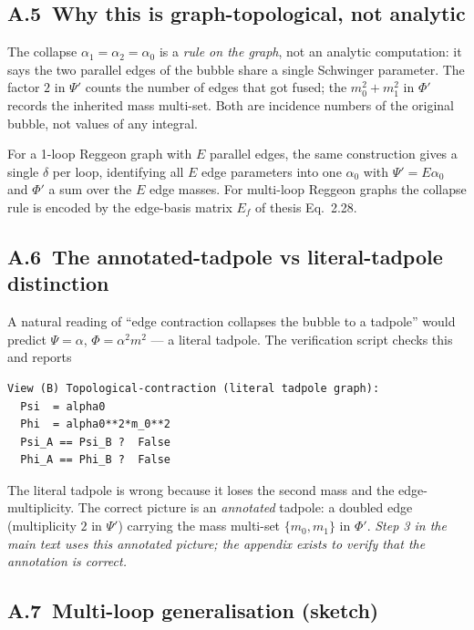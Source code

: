 \documentclass[11pt,a4paper]{article}
\begin{document}
\subsection*{A.5\ Why this is graph-topological, not analytic}

The collapse $\alpha_{1} = \alpha_{2} = \alpha_{0}$ is a \emph{rule on the graph}, not an
analytic computation: it says the two parallel edges of the bubble share a single
Schwinger parameter. The factor $2$ in $\Psi'$ counts the number of edges that got fused;
the $m_{0}^{2}+m_{1}^{2}$ in $\Phi'$ records the inherited mass multi-set. Both are
incidence numbers of the original bubble, not values of any integral.

For a 1-loop Reggeon graph with $E$ parallel edges, the same construction gives a single
$\delta$ per loop, identifying all $E$ edge parameters into one $\alpha_{0}$ with
$\Psi' = E\alpha_{0}$ and $\Phi'$ a sum over the $E$ edge masses. For multi-loop Reggeon
graphs the collapse rule is encoded by the edge-basis matrix $E_{f}$ of thesis Eq.~2.28.

\subsection*{A.6\ The annotated-tadpole vs literal-tadpole distinction}

A natural reading of ``edge contraction collapses the bubble to a tadpole'' would predict
$\Psi=\alpha$, $\Phi=\alpha^{2}m^{2}$ --- a literal tadpole. The verification script
checks this and reports
\begin{verbatim}
View (B) Topological-contraction (literal tadpole graph):
  Psi  = alpha0
  Phi  = alpha0**2*m_0**2
  Psi_A == Psi_B ?  False
  Phi_A == Phi_B ?  False
\end{verbatim}
The literal tadpole is wrong because it loses the second mass and the edge-multiplicity.
The correct picture is an \emph{annotated} tadpole: a doubled edge (multiplicity $2$ in
$\Psi'$) carrying the mass multi-set $\{m_{0},m_{1}\}$ in $\Phi'$. \emph{Step 3 in the
main text uses this annotated picture; the appendix exists to verify that the annotation
is correct.}

\subsection*{A.7\ Multi-loop generalisation (sketch)}
\end{document}
